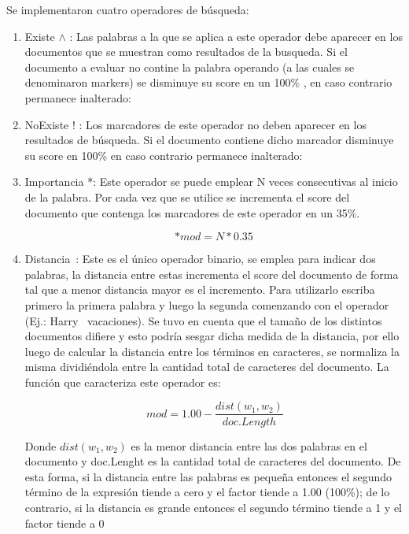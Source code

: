 \documentclass[a4paper,12pt]{article}
\begin{document}
Se implementaron cuatro operadores de búsqueda:
\begin{enumerate}
    \item  Existe $\wedge$ : Las palabras a la que se aplica a este operador debe aparecer en los
    documentos que se muestran como resultados de la busqueda. Si el documento a
    evaluar no contine la palabra operando (a las cuales se denominaron markers) se
    disminuye su score en un 100$\%$ , en caso contrario permanece inalterado:

    \item NoExiste ! : Los marcadores de este operador no deben aparecer en los resultados de
    búsqueda. Si el documento contiene dicho marcador disminuye su score en 100\% en
    caso contrario permanece inalterado:

    \item Importancia *: Este operador se puede emplear N veces consecutivas al inicio de la
    palabra. Por cada vez que se utilice se incrementa el score del documento que contenga
    los marcadores de este operador en un 35\%.
        \begin{center}
        \begin{equation}
            *mod = N * 0.35
        \end{equation}
        \end{center}

    \item Distancia~: Este es el único operador binario, se emplea para indicar dos palabras, la
    distancia entre estas incrementa el score del documento de forma tal que a menor
    distancia mayor es el incremento. Para utilizarlo escriba primero la primera palabra y
    luego la segunda comenzando con el operador (Ej.: Harry ~vacaciones).
    Se tuvo en cuenta que el tamaño de los distintos documentos difiere y esto podría sesgar
    dicha medida de la distancia, por ello luego de calcular la distancia entre los términos en
    caracteres, se normaliza la misma dividiéndola entre la cantidad total de caracteres del
    documento. La función que caracteriza este operador es:
        \begin{center}
        \begin{equation}
            ~mod = 1.00 - \frac{dist(w_1,w_2)}{doc.Length}
        \end{equation}
        \end{center}
    Donde $dist(w_1, w_2)$ es la menor distancia entre las dos palabras en el
    documento y doc.Lenght es la cantidad total de caracteres del documento.
    De esta forma, si la distancia entre las palabras es pequeña entonces el segundo término
    de la expresión tiende a cero y el factor tiende a 1.00 (100\%); de lo contrario, si la
    distancia es grande entonces el segundo término tiende a 1 y el factor tiende a 0%

\end{enumerate} 
\end{document}
